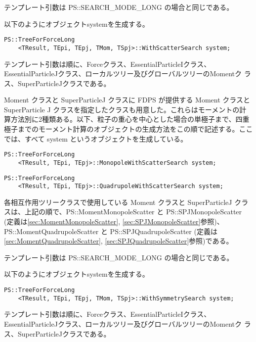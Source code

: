 テンプレート引数は PS::SEARCH\_MODE\_LONG の場合と同じである。

以下のようにオブジェクトsystemを生成する。
\begin{screen}
\begin{verbatim}
PS::TreeForForceLong
    <TResult, TEpi, TEpj, TMom, TSpj>::WithScatterSearch system;
\end{verbatim}
\end{screen}
テンプレート引数は順に、Forceクラス、EssentialParticleIクラス、
EssentialParticleJクラス、ローカルツリー及びグローバルツリーのMomentク
ラス、SuperParticleJクラスである。

Moment クラスと SuperParticleJ クラスに FDPS が提供する Moment クラスと SuperParticle J クラスを指定したクラスも用意した。これらはモーメントの計算方法別に2種類ある。以下、粒子の重心を中心とした場合の単極子まで、四重極子までのモーメント計算のオブジェクトの生成方法をこの順で記述する。ここでは、すべて system というオブジェクトを生成している。

\begin{screen}
\begin{verbatim}
PS::TreeForForceLong
    <TResult, TEpi, TEpj>::MonopoleWithScatterSearch system;
\end{verbatim}
\end{screen}


\begin{screen}
\begin{verbatim}
PS::TreeForForceLong
    <TResult, TEpi, TEpj>::QuadrupoleWithScatterSearch system;
\end{verbatim}
\end{screen}

各相互作用ツリークラスで使用している Moment クラスと SuperParticleJ クラスは、上記の順で、PS::MomentMonopoleScatter と PS::SPJMonopoleScatter
(定義は\ref{sec:MomentMonopoleScatter}, \ref{sec:SPJMonopoleScatter}参照)、PS::MomentQuadrupoleScatter と PS::SPJQuadrupoleScatter
(定義は\ref{sec:MomentQuadrupoleScatter}, \ref{sec:SPJQuadrupoleScatter}参照)である。


テンプレート引数は PS::SEARCH\_MODE\_LONG の場合と同じである。

以下のようにオブジェクトsystemを生成する。
\begin{screen}
\begin{verbatim}
PS::TreeForForceLong
    <TResult, TEpi, TEpj, TMom, TSpj>::WithSymmetrySearch system;
\end{verbatim}
\end{screen}
テンプレート引数は順に、Forceクラス、EssentialParticleIクラス、
EssentialParticleJクラス、ローカルツリー及びグローバルツリーのMomentク
ラス、SuperParticleJクラスである。

